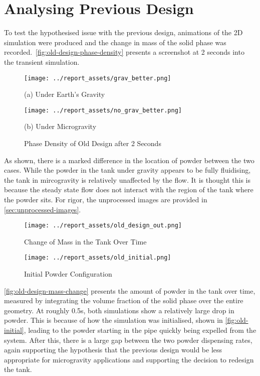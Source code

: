\section{Analysing Previous Design}\label{sec:prev-design-analysis}
To test the hypothesised issue with the previous design, animations of the 2D simulation were produced and the change in mass of the solid phase was recorded.~\autoref{fig:old-design-phase-density} presents a screenshot at 2 seconds into the transient simulation. 
\begin{figure}[htbp]
    \centering
    
    \begin{minipage}{0.4\textwidth}
        \centering
        \texttt{[image: ../report\_assets/grav\_better.png]}
        \caption*{(a) Under Earth's Gravity}
    \end{minipage}
    \hfill
    \begin{minipage}{0.4\textwidth}
        \centering
        \texttt{[image: ../report\_assets/no\_grav\_better.png]}
        \caption*{(b) Under Microgravity}
    \end{minipage}
    \caption{Phase Density of Old Design after 2 Seconds}\label{fig:old-design-phase-density}
\end{figure}
As shown, there is a marked difference in the location of powder between the two cases. While the powder in the tank under gravity appears to be fully fluidising, the tank in mircogravity is relatively unaffected by the flow. It is thought this is because the steady state flow does not interact with the region of the tank where the powder sits. For rigor, the unprocessed images are provided in \autoref{sec:unprocessed-images}.

\begin{figure}[htbp]
    \centering
    
    \begin{minipage}{0.54\textwidth}
        \centering
        \texttt{[image: ../report\_assets/old\_design\_out.png]}
        \caption{Change of Mass in the Tank Over Time}\label{fig:old-design-mass-change}
    \end{minipage}
    \hfill
    \begin{minipage}{0.4\textwidth}
        \centering
        \texttt{[image: ../report\_assets/old\_initial.png]}
        \caption{Initial Powder Configuration}\label{fig:old-initial}
    \end{minipage}
\end{figure}
\autoref{fig:old-design-mass-change} presents the amount of powder in the tank over time, measured by integrating the volume fraction of the solid phase over the entire geometry. At roughly 0.5s, both simulations show a relatively large drop in powder. This is because of how the simulation was initialised, shown in \autoref{fig:old-initial}, leading to the powder starting in the pipe quickly being expelled from the system. After this, there is a large gap between the two powder dispensing rates, again supporting the hypothesis that the previous design would be less appropriate for microgravity applications and supporting the decision to redesign the tank. 

